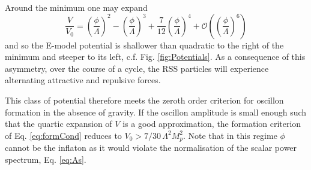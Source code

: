 \documentclass[11pt,a4paper]{article}
\begin{document}
Around the minimum one may expand
\begin{equation}
\frac{V}{V_0}=\left(\frac{\phi}{\Lambda}\right)^2-\left(\frac{\phi}{\Lambda}\right)^3+\frac{7}{12}\left(\frac{\phi}{\Lambda}\right)^4+\mathcal{O}\left(\left(\frac{\phi}{\Lambda}\right)^6\right)
\end{equation}
and so the E-model potential is shallower than quadratic to the right of the minimum and steeper to its left, c.f. Fig. \ref{fig:Potentials}. As a consequence of this asymmetry, over the course of a cycle, the RSS particles will experience alternating attractive and repulsive forces.


This class of potential therefore meets the zeroth order criterion for oscillon formation in the absence of gravity. If the oscillon amplitude is small enough such that the quartic expansion of $V$ is a good approximation, the  formation criterion of  Eq. \eqref{eq:formCond} reduces to $V_0 >7/30 \, \Lambda^2 M_p^2$. Note that in this regime $\phi$ cannot be the inflaton as it would violate the normalisation of the scalar power spectrum, Eq. \eqref{eq:As}.\\
\end{document}
